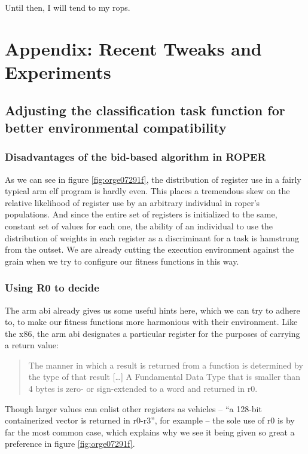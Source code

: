 \documentclass[12pt,glossary]{dalthesis}
\begin{document}
Until then, I will tend to my \glspl{rop}.


\appendix
\chapter{Appendix: Recent Tweaks and Experiments}
\label{sec:org59d2c3e}
\section{Adjusting the classification task function for better environmental compatibility}
\label{sec:org73387c0}
\subsection{Disadvantages of the bid-based algorithm in ROPER}
\label{sec:orgdd04707}
As we can see in figure \ref{fig:orge07291f}, the distribution of register use
in a fairly typical \gls{arm} \gls{elf} program is hardly even. This places a tremendous skew
on the relative likelihood of register use by an arbitrary individual in \gls{roper}'s
populations. And since the entire set of registers is initialized to the same, constant
set of values for each one, the ability of an individual to use the distribution of weights
in each register as a discriminant for a task is hamstrung from the outset. We are already
cutting the execution environment against the grain when we try to configure our
fitness functions in this way.
\subsection{Using R0 to decide}
\label{sec:orgce442b4}
\label{org8dd1928}
The \gls{arm} \gls{abi} \cite{arm_abi} already gives us some useful hints here, which we can try to adhere to, to
make our fitness functions more harmonious with their environment. Like the x86, the \gls{arm}
\gls{abi} designates a particular register for the purposes of carrying a return value:
\begin{quote}
The manner in which a result is returned from a function is determined by the type of that
result [\ldots{}] A Fundamental Data Type that is smaller than 4 bytes is zero- or sign-extended
to a word and returned in r0.
\end{quote}
Though larger values can enlist other registers as vehicles -- ``a 128-bit containerized vector
is returned in r0-r3'', for example -- the sole use of r0 is by far the most common case, which
explains why we see it being given so great a preference in figure \ref{fig:orge07291f}. 
\end{document}
